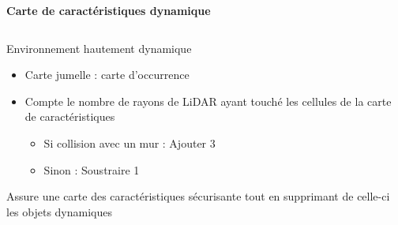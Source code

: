 \documentclass[aspectratio=169,10pt]{beamer}
\begin{document}
\begin{frame}{\textbf{Carte de caractéristiques dynamique}}
	\begin{columns}
		\begin{column}{0.7\textwidth}
			Environnement hautement dynamique
			\begin{itemize}
				\item Carte jumelle : carte d'occurrence
				\item Compte le nombre de rayons de LiDAR ayant touché les cellules de la carte de caractéristiques
				\begin{itemize}
					\item Si collision avec un mur : Ajouter 3
					\item Sinon : Soustraire 1
				\end{itemize}
			\end{itemize}
			\vspace{0.5em}
			
			Assure une carte des caractéristiques sécurisante tout en supprimant de celle-ci les objets dynamiques


\end{column}
\end{columns}
\end{frame}
\end{document}
